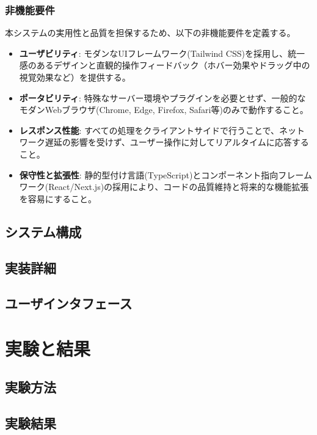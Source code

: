 \documentclass[uplatex,a4paper,12pt]{ujreport}
\begin{document}
\subsection{非機能要件}
本システムの実用性と品質を担保するため、以下の非機能要件を定義する。
\begin{itemize}
  \item \textbf{ユーザビリティ}: モダンなUIフレームワーク(Tailwind CSS)を採用し、統一感のあるデザインと直観的操作フィードバック（ホバー効果やドラッグ中の視覚効果など）を提供する。
  \item \textbf{ポータビリティ}: 特殊なサーバー環境やプラグインを必要とせず、一般的なモダンWebブラウザ(Chrome, Edge, Firefox, Safari等)のみで動作すること。
  \item \textbf{レスポンス性能}: すべての処理をクライアントサイドで行うことで、ネットワーク遅延の影響を受けず、ユーザー操作に対してリアルタイムに応答すること。
  \item \textbf{保守性と拡張性}: 静的型付け言語(TypeScript)とコンポーネント指向フレームワーク(React/Next.js)の採用により、コードの品質維持と将来的な機能拡張を容易にすること。
\end{itemize}
\section{システム構成}
\section{実装詳細}
\section{ユーザインタフェース}


\chapter{実験と結果}
\section{実験方法}
\section{実験結果}


\end{document}
